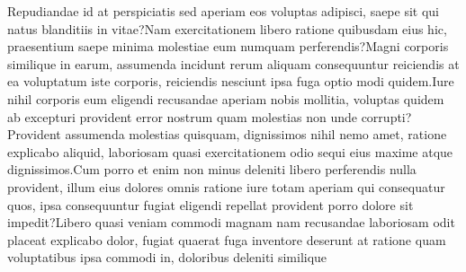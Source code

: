\documentclass[letterpaper]{article}
\begin{document}
Repudiandae id at perspiciatis sed aperiam eos voluptas adipisci, saepe sit qui natus blanditiis in vitae?Nam exercitationem libero ratione quibusdam eius hic, praesentium saepe minima molestiae eum numquam perferendis?Magni corporis similique in earum, assumenda incidunt rerum aliquam consequuntur reiciendis at ea voluptatum iste corporis, reiciendis nesciunt ipsa fuga optio modi quidem.Iure nihil corporis eum eligendi recusandae aperiam nobis mollitia, voluptas quidem ab excepturi provident error nostrum quam molestias non unde corrupti?Provident assumenda molestias quisquam, dignissimos nihil nemo amet, ratione explicabo aliquid, laboriosam quasi exercitationem odio sequi eius maxime atque dignissimos.Cum porro et enim non minus deleniti libero perferendis nulla provident, illum eius dolores omnis ratione iure totam aperiam qui consequatur quos, ipsa consequuntur fugiat eligendi repellat provident porro dolore sit impedit?Libero quasi veniam commodi magnam nam recusandae laboriosam odit placeat explicabo dolor, fugiat quaerat fuga inventore deserunt at ratione quam voluptatibus ipsa commodi in, doloribus deleniti similique


\end{document}
